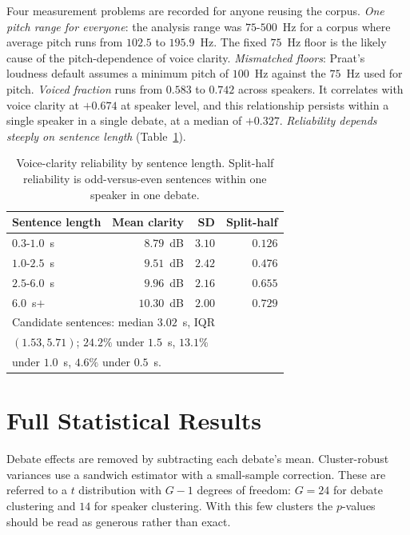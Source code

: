 \documentclass[pdflatex,sn-apa]{sn-jnl}%
\begin{document}
Four measurement problems are recorded for anyone reusing the corpus.
\emph{One pitch range for everyone}: the analysis range was $75$-$500$~Hz
for a corpus where average pitch runs from $102.5$ to $195.9$~Hz. The
fixed $75$~Hz floor is the likely cause of the pitch-dependence of voice
clarity. \emph{Mismatched floors}: Praat's loudness default assumes a
minimum pitch of $100$~Hz against the $75$~Hz used for pitch. \emph{Voiced
fraction} runs from $0.583$ to $0.742$ across speakers. It correlates with
voice clarity at $+0.674$ at speaker level, and this relationship persists
within a single speaker in a single debate, at a median of $+0.327$.
\emph{Reliability depends steeply on sentence length} (Table~\ref{s:tab:reliab}).

\begin{table}[!htbp]
\caption{Voice-clarity reliability by sentence length. Split-half reliability
is odd-versus-even sentences within one speaker in one debate.}
\label{s:tab:reliab}
\centering
\begin{tabular}{lrrr}
\toprule
Sentence length & Mean clarity & SD & Split-half \\
\midrule
$0.3$-$1.0$~s  & $8.79$~dB  & $3.10$ & $0.126$ \\
$1.0$-$2.5$~s  & $9.51$~dB  & $2.42$ & $0.476$ \\
$2.5$-$6.0$~s  & $9.96$~dB  & $2.16$ & $0.655$ \\
$6.0$~s$+$      & $10.30$~dB & $2.00$ & $0.729$ \\
\midrule
\multicolumn{4}{l}{Candidate sentences: median $3.02$~s, IQR} \\
\multicolumn{4}{l}{$(1.53, 5.71)$; $24.2\%$ under $1.5$~s, $13.1\%$} \\
\multicolumn{4}{l}{under $1.0$~s, $4.6\%$ under $0.5$~s.} \\
\bottomrule
\end{tabular}
\end{table}

\section{Full Statistical Results}
\label{s:stats}

Debate effects are removed by subtracting each debate's mean. Cluster-robust
variances use a sandwich estimator with a small-sample correction. These are
referred to a $t$ distribution with $G-1$ degrees of freedom: $G = 24$ for
debate clustering and $14$ for speaker clustering. With this few clusters
the $p$-values should be read as generous rather than exact.
\end{document}
